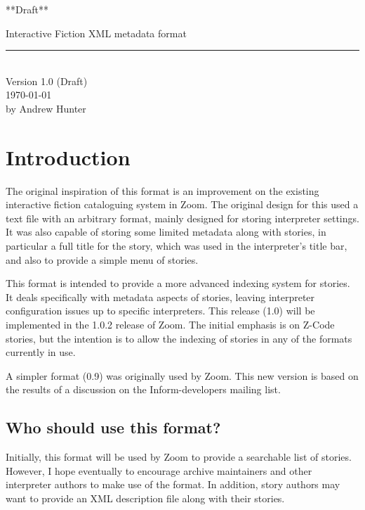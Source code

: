\documentclass[a4paper,11pt]{article}
\begin{document}
\begin{titlepage}

\begin{flushright}
**Draft**
\end{flushright}

\rule{0cm}{6cm}

\begin{flushright}
\sst
Interactive Fiction XML metadata format\rm\\
\rule{16cm}{1.2mm}\\
Version 1.0 (Draft)\\
\today\\
by Andrew Hunter
\end{flushright}
\vfill

\end{titlepage}

\tableofcontents

\section{Introduction}

The original inspiration of this format is an improvement on the existing interactive fiction
cataloguing system in Zoom. The original design for this used a text file with an arbitrary
format, mainly designed for storing interpreter settings. It was also capable of storing
some limited metadata along with stories, in particular a full title for the story, which
was used in the interpreter's title bar, and also to provide a simple menu of stories.

This format is intended to provide a more advanced indexing system for stories. It
deals specifically with metadata aspects of stories, leaving interpreter configuration
issues up to specific interpreters. This release (1.0) will be implemented in the 1.0.2
release of Zoom. The initial emphasis is on Z-Code stories, but the intention is to allow
the indexing of stories in any of the formats currently in use.

A simpler format (0.9) was originally used by Zoom. This new version is based on the
results of a discussion on the Inform-developers mailing list.

\subsection{Who should use this format?}

Initially, this format will be used by Zoom to provide a searchable list of stories. However,
I hope eventually to encourage archive maintainers and other interpreter authors to make
use of the format. In addition, story authors may want to provide an XML description file
along with their stories.
\end{document}
